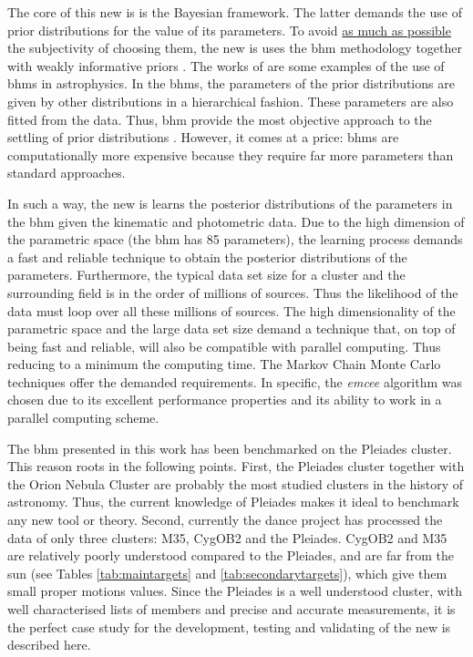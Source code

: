 The core of this new \gls{is} is the Bayesian framework. The latter demands the use of prior distributions for the value of its parameters. To avoid \underline{as much as possible} the subjectivity of choosing them, the new \gls{is} uses the \gls{bhm} methodology together with weakly informative priors  \cite[see][]{Gelman2006,Gelman2008,Huang2013,Chung2015}. The works of \citet{Jefferys2007,Shkedy2007,Hogg2010,Sale2012, Feeney2013} are some examples of the use of \glspl{bhm} in astrophysics. In the \glspl{bhm}, the parameters of the prior distributions are given by other distributions in a hierarchical fashion. These parameters are also fitted from the data. Thus, \gls{bhm} provide the most objective approach to the settling of prior distributions \citep{Gelman2006}. However, it comes at a price: \glspl{bhm} are computationally more expensive because they require far more parameters than standard approaches. 

In such a way, the new \gls{is} learns the posterior distributions of the parameters in the \gls{bhm} given the kinematic and photometric data. Due to the high dimension of the parametric space (the \gls{bhm} has 85 parameters), the learning process demands a fast and reliable technique to obtain the posterior distributions of the parameters. Furthermore, the typical data set size for a cluster and the surrounding field is in the order of millions of sources. Thus the likelihood of the data must loop over all these millions of sources. The high dimensionality of the parametric space and the large data set size demand a technique that, on top of being fast and reliable, will also be compatible with parallel computing. Thus reducing to a minimum the computing time. The Markov Chain Monte Carlo techniques offer the demanded requirements. In specific, the \emph{emcee} algorithm \citep{Foreman2013} was chosen due to  its excellent performance properties and its ability to work in a parallel computing scheme.  

The \gls{bhm} presented in this work has been benchmarked on the Pleiades cluster. This reason roots in the following points. First, the Pleiades cluster together with the Orion Nebula Cluster are probably the most studied clusters in the history of astronomy. Thus, the current knowledge of Pleiades makes it ideal to benchmark any new tool or theory. Second, currently the \gls{dance} project has processed the data of only three clusters: M35, CygOB2 and the Pleiades. CygOB2 and M35 are relatively poorly understood compared to the Pleiades, and are far from the sun (see Tables \ref{tab:maintargets} and \ref{tab:secondarytargets}), which give them small proper motions values. Since the Pleiades is a well understood cluster, with well characterised lists of members \cite[e.g][]{Stauffer2007, Lodieu2012, Sarro2014, Bouy2015} and precise and accurate measurements, it is the perfect case study for the development, testing and validating of the new \gls{is} described here.

